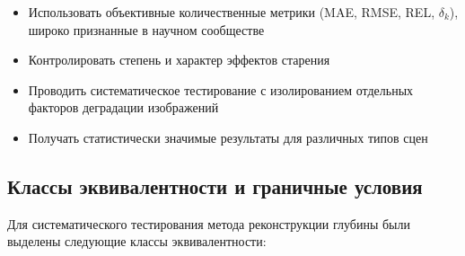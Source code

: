 \begin{itemize}
    \item Использовать объективные количественные метрики (MAE, RMSE, REL, $\delta_k$), широко признанные в научном сообществе~\cite{vis3}
    \item Контролировать степень и характер эффектов старения
    \item Проводить систематическое тестирование с изолированием отдельных факторов деградации изображений
    \item Получать статистически значимые результаты для различных типов сцен
\end{itemize}

\subsection{Классы эквивалентности и граничные условия}

Для систематического тестирования метода реконструкции глубины были выделены следующие классы эквивалентности:


